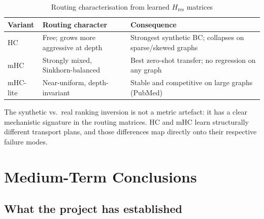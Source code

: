 \documentclass[11pt,a4paper]{article}
\begin{document}
\begin{table}[h]
\centering
\caption{Routing characterisation from learned $H_\text{res}$ matrices}
\begin{tabular}{L{2.8cm} L{3.8cm} L{4.8cm}}
\toprule
Variant & Routing character & Consequence \\
\midrule
HC       & Free; grows more aggressive at depth
         & Strongest synthetic BC; collapses on sparse/skewed graphs \\
mHC      & Strongly mixed, Sinkhorn-balanced
         & Best zero-shot transfer; no regression on any graph \\
mHC-lite & Near-uniform, depth-invariant
         & Stable and competitive on large graphs (PubMed) \\
\bottomrule
\end{tabular}
\end{table}

The synthetic vs.\ real ranking inversion is not a metric artefact:
it has a clear mechanistic signature in the routing matrices.
HC and mHC learn structurally different transport plans,
and those differences map directly onto their respective
failure modes.

\section{Medium-Term Conclusions}

\subsection{What the project has established}
\end{document}
